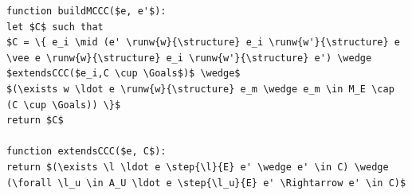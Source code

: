 \begin{lstlisting}[language={pseudocode},label={lst:viejoMCCC},caption={vieja descripción estados ganadores},float=ht, frame=single]
function buildMCCC($e, e'$):
let $C$ such that
$C = \{ e_i \mid (e' \runw{w}{\structure} e_i \runw{w'}{\structure} e \vee e \runw{w}{\structure} e_i \runw{w'}{\structure} e') \wedge $extendsCCC($e_i,C \cup \Goals$)$ \wedge$
$(\exists w \ldot e \runw{w}{\structure} e_m \wedge e_m \in M_E \cap (C \cup \Goals)) \}$
return $C$

function extendsCCC($e, C$):
return $(\exists \l \ldot e \step{\l}{E} e' \wedge e' \in C) \wedge (\forall \l_u \in A_U \ldot e \step{\l_u}{E} e' \Rightarrow e' \in C)$

\end{lstlisting}
